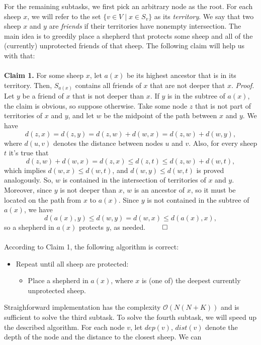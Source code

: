 For the remaining subtasks, we first pick an arbitrary node as the root.
For each sheep $x$, we will refer to the set $\{v \in V \mid x \in S_v\}$ as its
\textit{territory}. We say that two sheep $x$ and $y$ are \textit{friends} if
their territories have nonempty intersection. The main idea is to greedily place
a shepherd that protects some sheep and all of the (currently) unprotected friends
of that sheep. The following claim will help us with that:
\\\\
\textbf{Claim 1.} For some sheep $x$, let $a(x)$ be its highest ancestor that
is in its territory. Then, $S_{a(x)}$ contains all friends of $x$ that are not
deeper that $x$.
\textit{Proof.} Let $y$ be a friend of $x$ that is not deeper than $x$. If $y$
is in the subtree of $a(x)$, the claim is obvious, so suppose otherwise. Take
some node $z$ that is not part of territories of $x$ and $y$, and let $w$ be the
midpoint of the path between $x$ and $y$. We have
$$d(z, x) = d(z, y) = d(z, w) + d(w, x) = d(z, w) + d(w, y),$$ where $d(u, v)$
denotes the distance between nodes $u$ and $v$. Also, for every sheep $t$ it's
true that 
$$d(z, w) + d(w, x) = d(z, x) \leq d(z, t) \leq d(z, w) + d(w, t),$$ which
implies
$d(w, x) \leq d(w, t)$, and $d(w, y) \leq d(w, t)$ is proved analogously.
So, $w$ is contained in the intersection of territories of $x$ and $y$.
Moreover, since $y$ is not deeper than $x$, $w$ is an ancestor of $x$, so it
must be located on the path from $x$ to $a(x)$. Since $y$ is not contained in
the subtree of $a(x)$, we have $$d(a(x), y) \leq
d(w, y) = d(w, x) \leq d(a(x), x),$$ so a shepherd in $a(x)$ protects $y$, as
needed. $\qed$
\\\\
According to Claim 1, the following algorithm is correct:
\begin{itemize}
    \item Repeat until all sheep are protected:
    \begin{itemize}
        \item Place a shepherd in $a(x)$, where $x$ is (one of) the deepest
            currently unprotected sheep.
    \end{itemize}
\end{itemize}
Straighforward implementation has the complexity $\mathcal{O}(N(N + K))$ and is
sufficient to solve the third subtask. To solve the fourth subtask, we will
speed up the described algorithm. For each node $v$, let $dep(v)$, $dist(v)$
denote the depth of the node and the distance to the closest sheep. We can
